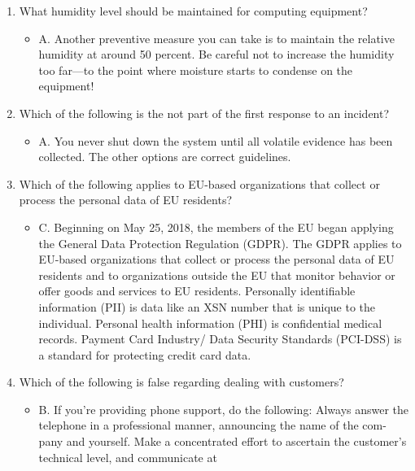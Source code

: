 \documentclass{article}
\begin{document}
\begin{enumerate}
\begin{itemize}
(SOW) is a document that indicates the work to be performed. A service level agreement
is a document that indicates what is being paid and what the service consists of. A
memorandum of understanding (MOU) is a document that indicates the intent of two
parties to do something together.
    \end{itemize}
    \item What humidity level should be maintained for computing equipment?
    \begin{itemize}
        \item A. Another preventive measure you can take is to maintain the relative humidity at around
50 percent. Be careful not to increase the humidity too far—to the point where moisture
starts to condense on the equipment!
    \end{itemize}
    \item Which of the following is the not part of the first response to an incident?
    \begin{itemize}
        \item A. You never shut down the system until all volatile evidence has been collected. The other
options are correct guidelines.
    \end{itemize}
    \item Which of the following applies to EU-based organizations that collect or process the
personal data of EU residents?
    \begin{itemize}
        \item C. Beginning on May 25, 2018, the members of the EU began applying the General
Data Protection Regulation (GDPR). The GDPR applies to EU-based organizations that
collect or process the personal data of EU residents and to organizations outside the EU
that monitor behavior or offer goods and services to EU residents. Personally identifiable
information (PII) is data like an XSN number that is unique to the individual. Personal
health information (PHI) is confidential medical records. Payment Card Industry/ Data
Security Standards (PCI-DSS) is a standard for protecting credit card data.
    \end{itemize}
    \item Which of the following is false regarding dealing with customers?
    \begin{itemize}
        \item B. If you’re providing phone support, do the following:
Always answer the telephone in a professional manner, announcing the name of the com-
pany and yourself.
Make a concentrated effort to ascertain the customer’s technical level, and communicate at

\end{itemize}
\end{enumerate}
\end{document}
